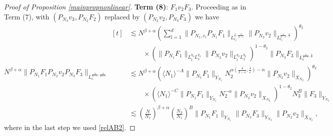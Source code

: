 \documentclass[aihp]{imsart}
\numberwithin{equation}{section}
\theoremstyle{plain}
\theoremstyle{remark}
\begin{document}
\begin{proof}[Proof of Proposition \ref{mainpropnonlinear}]
\textbf{Term (8)}:  $F_1 v_2 F_3$. 
Proceeding as in Term (7), with $(P_{N_3}v_3, P_{N_2}F_2)$ replaced by $(P_{N_2}v_2, P_{N_3} F_3)$  we have
\begin{equation*}
 N^{\beta +\alpha} \|P_{N_1}F_1  P_{N_2} v_2 P_{N_3} F_3\|_{L^{\frac{4}{4-\varepsilon} ,\frac{4}{2+\varepsilon}}_e} 
\begin{aligned}[t]
& \lesssim N^{\beta +\alpha} \left( \sum_{l=1}^d\|P_{N_1 ,e_l}P_{N_1} F_1\|_{L_{e_l}^{\frac{4}{\varepsilon} ,\frac{4}{2-\varepsilon} }}  \|P_{N_2} v_2\|_{L_{e_l}^{\frac{4}{2-\varepsilon}, \frac{4}{\varepsilon}}} \right)^{\theta_2} \\
&\qquad \times (\|P_{N_1}F_1\|_{L^{q_3}_t L_x^{ q_3 }} \|P_{N_2} v_2 \|_{L_t^{q_2 }L_x^{q_2} } )^{1-\theta_2}  \|P_{N_3} F_3\|_{L_e^{\frac{4}{2-\varepsilon} , \frac{4}{\varepsilon}}} \\
&\lesssim  N^{\beta +\alpha} (\langle N_1 \rangle^{-A} \|P_{N_1}F_1\|_{Y_{N_1}} N_2^{\alpha (\frac{4}{2-\varepsilon} ,\frac{4}{\varepsilon}) -\alpha} \|P_{N_2} v_2\|_{X_{N_2}} )^{\theta_2} \\
& \qquad \times (\langle N_1\rangle^{-C}\|P_{N_1}F_1\|_{Y_{N_1}}N_2^{-\alpha} \|P_{N_2}v_2 \|_{X_{N_2}} )^{1-\theta_2}  N_3^{B}\|F_3\|_{Y_{N_3}} \\
&\lesssim \left(\frac{N}{N_1}\right)^{\beta +\alpha}
\left(\frac{N_3 }{N_1}\right)^{ B}   \|P_{N_1}F_1\|_{Y_{N_1}}  \|P_{N_3 }F_3\|_{Y_{N_3}}   \|P_{N_2} v_2\|_{X_{N_2}},
\end{aligned}
\end{equation*}
where in the last step we used \eqref{relAB2}. 
\end{proof}
\end{document}
